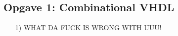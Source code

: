 \subsection{Opgave 1: Combinational VHDL}
\begin{enumerate}
	\item[1)]
WHAT DA FUCK IS WRONG WITH UUU!
	
\end{enumerate}